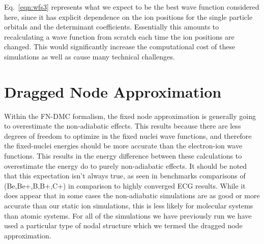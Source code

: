 \documentclass[aip,jcp,numerical,reprint]{revtex4-1}
\begin{document}
Eq.~\eqref{eqn:wfs3} represents what we expect to be the best wave function considered here, since it has explicit dependence on the ion positions for the single particle orbitals and the determinant coefficients. Essentially this amounts to recalculating a wave function from scratch each time the ion positions are changed.  This would significantly increase the computational cost of these simulations as well as cause many technical challenges. 


\section{Dragged Node Approximation}


Within the FN-DMC formalism, the fixed node approximation is generally going to overestimate the non-adiabatic effects.   This results because there are less degrees of freedom to optimize in the fixed nuclei wave functions, and therefore the fixed-nuclei energies should be more accurate than the electron-ion wave functions.   This results in the energy difference between these calculations to overestimate the energy do to purely non-adiabatic effects.  It should be noted that this expectation isn't always true, as seen in benchmarks comparisons of (Be,Be+,B,B+,C+) in comparison to highly converged ECG results.  While it does appear that in some cases the non-adiabatic simulations are as good or more accurate than our static ion simulations, this is less likely for molecular systems than atomic systems.    %
For all of the simulations we have previously run we have used a particular type of nodal structure which we termed the dragged node approximation.
 
\end{document}
